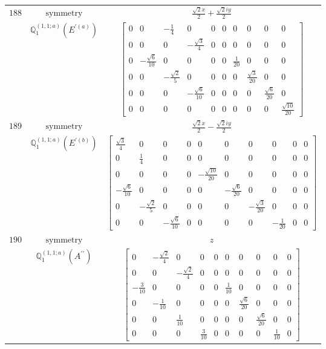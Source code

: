 \documentclass[fleqn,8pt,landscape]{jsarticle}
\begin{document}
\begin{longtable}{ccc}
$ 188 $ & $ \text{symmetry} $ & $ \frac{\sqrt{2} x}{2} + \frac{\sqrt{2} i y}{2} $ \\
$  $ & $ \mathbb{Q}_{1}^{(1,1;a)}(E^{\prime(a)}) $ & $ \begin{bmatrix} 0 & 0 & - \frac{1}{4} & 0 & 0 & 0 & 0 & 0 & 0 & 0 \\ 0 & 0 & 0 & - \frac{\sqrt{3}}{4} & 0 & 0 & 0 & 0 & 0 & 0 \\ 0 & - \frac{\sqrt{6}}{10} & 0 & 0 & 0 & 0 & \frac{1}{20} & 0 & 0 & 0 \\ 0 & 0 & - \frac{\sqrt{2}}{5} & 0 & 0 & 0 & 0 & \frac{\sqrt{3}}{20} & 0 & 0 \\ 0 & 0 & 0 & - \frac{\sqrt{6}}{10} & 0 & 0 & 0 & 0 & \frac{\sqrt{6}}{20} & 0 \\ 0 & 0 & 0 & 0 & 0 & 0 & 0 & 0 & 0 & \frac{\sqrt{10}}{20} \end{bmatrix} $ \\ \hline
$ 189 $ & $ \text{symmetry} $ & $ \frac{\sqrt{2} x}{2} - \frac{\sqrt{2} i y}{2} $ \\
$  $ & $ \mathbb{Q}_{1}^{(1,1;a)}(E^{\prime(b)}) $ & $ \begin{bmatrix} \frac{\sqrt{3}}{4} & 0 & 0 & 0 & 0 & 0 & 0 & 0 & 0 & 0 \\ 0 & \frac{1}{4} & 0 & 0 & 0 & 0 & 0 & 0 & 0 & 0 \\ 0 & 0 & 0 & 0 & - \frac{\sqrt{10}}{20} & 0 & 0 & 0 & 0 & 0 \\ - \frac{\sqrt{6}}{10} & 0 & 0 & 0 & 0 & - \frac{\sqrt{6}}{20} & 0 & 0 & 0 & 0 \\ 0 & - \frac{\sqrt{2}}{5} & 0 & 0 & 0 & 0 & - \frac{\sqrt{3}}{20} & 0 & 0 & 0 \\ 0 & 0 & - \frac{\sqrt{6}}{10} & 0 & 0 & 0 & 0 & - \frac{1}{20} & 0 & 0 \end{bmatrix} $ \\ \hline
$ 190 $ & $ \text{symmetry} $ & $ z $ \\
$  $ & $ \mathbb{Q}_{1}^{(1,1;a)}(A^{\prime\prime}) $ & $ \begin{bmatrix} 0 & - \frac{\sqrt{2}}{4} & 0 & 0 & 0 & 0 & 0 & 0 & 0 & 0 \\ 0 & 0 & - \frac{\sqrt{2}}{4} & 0 & 0 & 0 & 0 & 0 & 0 & 0 \\ - \frac{3}{10} & 0 & 0 & 0 & 0 & \frac{1}{10} & 0 & 0 & 0 & 0 \\ 0 & - \frac{1}{10} & 0 & 0 & 0 & 0 & \frac{\sqrt{6}}{20} & 0 & 0 & 0 \\ 0 & 0 & \frac{1}{10} & 0 & 0 & 0 & 0 & \frac{\sqrt{6}}{20} & 0 & 0 \\ 0 & 0 & 0 & \frac{3}{10} & 0 & 0 & 0 & 0 & \frac{1}{10} & 0 \end{bmatrix} $ \\ \hline

\end{longtable}
\end{document}
